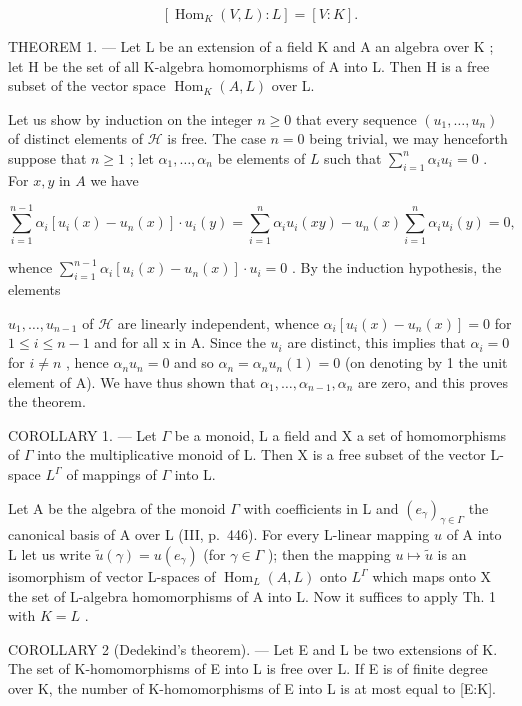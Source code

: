 \[
[ \operatorname{Hom} _ {K} (V, L): L ] = [ V: K ].\tag{2}
\]

THEOREM 1. --- Let L be an extension of a field K and A an algebra over K ; let H be the set of all K-algebra homomorphisms of A into L. Then H is a free subset of the vector space \(\operatorname{Hom}_{K}(A, L)\) over L.

Let us show by induction on the integer \(n \geqslant 0\) that every sequence \((u_1, \ldots, u_n)\) of distinct elements of \(\mathcal{H}\) is free. The case \(n = 0\) being trivial, we may henceforth suppose that \(n \geqslant 1\) ; let \(\alpha_1, \ldots, \alpha_n\) be elements of \(L\) such that \(\sum_{i=1}^{n} \alpha_i u_i = 0\) . For \(x, y\) in \(A\) we have

\[
\sum_ {i = 1} ^ {n - 1} \alpha_ {i} [ u _ {i} (x) - u _ {n} (x) ] \cdot u _ {i} (y) = \sum_ {i = 1} ^ {n} \alpha_ {i} u _ {i} (x y) - u _ {n} (x) \sum_ {i = 1} ^ {n} \alpha_ {i} u _ {i} (y) = 0,
\]

whence \(\sum_{i=1}^{n-1} \alpha_i [u_i(x) - u_n(x)] \cdot u_i = 0\) . By the induction hypothesis, the elements

\(u_{1}, \ldots, u_{n-1}\) of \(\mathscr{H}\) are linearly independent, whence \(\alpha_{i}[u_{i}(x) - u_{n}(x)] = 0\) for \(1 \leqslant i \leqslant n-1\) and for all x in A. Since the \(u_{i}\) are distinct, this implies that \(\alpha_{i} = 0\) for \(i \neq n\) , hence \(\alpha_{n}u_{n} = 0\) and so \(\alpha_{n} = \alpha_{n}u_{n}(1) = 0\) (on denoting by 1 the unit element of A). We have thus shown that \(\alpha_{1}, \ldots, \alpha_{n-1}, \alpha_{n}\) are zero, and this proves the theorem.

COROLLARY 1. --- Let \(\Gamma\) be a monoid, L a field and X a set of homomorphisms of \(\Gamma\) into the multiplicative monoid of L. Then X is a free subset of the vector L-space \(L^{\Gamma}\) of mappings of \(\Gamma\) into L.

Let A be the algebra of the monoid \(\Gamma\) with coefficients in L and \((e_{\gamma})_{\gamma \in \Gamma}\) the canonical basis of A over L (III, p.~446). For every L-linear mapping \(u\) of A into L let us write \(\tilde{u}(\gamma) = u(e_{\gamma})\) (for \(\gamma \in \Gamma\) ); then the mapping \(u \mapsto \tilde{u}\) is an isomorphism of vector L-spaces of \(\operatorname{Hom}_{L}(A, L)\) onto \(L^{\Gamma}\) which maps onto X the set of L-algebra homomorphisms of A into L. Now it suffices to apply Th. 1 with \(K = L\) .

COROLLARY 2 (Dedekind's theorem). --- Let E and L be two extensions of K. The set of K-homomorphisms of E into L is free over L. If E is of finite degree over K, the number of K-homomorphisms of E into L is at most equal to {[}E:K{]}.

